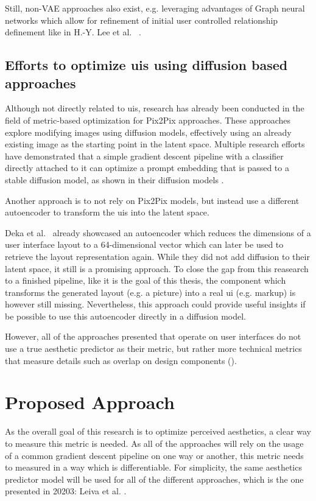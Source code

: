 \documentclass[10pt,a4paper]{scrartcl} %
\begin{document}
Still, non-VAE approaches also exist, e.g. leveraging advantages of Graph neural networks which allow for refinement of initial user controlled relationship definement like in  H.-Y. Lee et al. ~\cite{lee2020neural}.
 
\subsection{Efforts to optimize \ac{uis} using diffusion based approaches}
Although not directly related to \ac{uis}, research has already been conducted in the field of metric-based optimization for Pix2Pix approaches. These approaches explore modifying images using diffusion models\cite{rombach2021highresolution}, effectively using an already existing image as the starting point in the latent space.
Multiple research efforts have demonstrated that a simple gradient descent pipeline with a classifier directly attached to it can optimize a prompt embedding that is passed to a stable diffusion model, as shown in their diffusion models \cite{deckers2023manipulating,zhan2024capabilityaware}.

Another approach is to not rely on Pix2Pix models, but instead use a different autoencoder to transform the \acp{ui} into the latent space.

Deka et al.~\cite{10.1145/3126594.3126651} already showcased an autoencoder which reduces the dimensions of a user interface layout to a 64-dimensional vector which can later be used to retrieve the layout representation again. While they did not add diffusion to their latent space, it still is a promising approach. To close the gap from this reasearch to a finished pipeline, like it is the goal of this thesis, the component which transforms the generated layout (e.g. a picture) into a real \ac{ui} (e.g. markup) is however still missing.
Nevertheless, this approach could provide useful insights if be possible to use this autoencoder directly in a diffusion model.

However, all of the approaches presented that operate on user interfaces do not use a true aesthetic predictor as their metric, but rather more technical metrics that measure details such as overlap on design components (\cite{zhang2023layoutdiffusion}).


\section{Proposed Approach}
\label{sec:approach}
As the overall goal of this research is to optimize
perceived aesthetics, a clear way to measure this metric is needed. As all of the approaches will rely on the usage of a
common gradient descent pipeline on one way or another, this metric needs to measured in a way which is differentiable. For simplicity, the same aesthetics predictor model will be used for all of the different approaches, which is the one presented in
20203: Leiva et al. \cite{Leiva2023}. 
\end{document}
